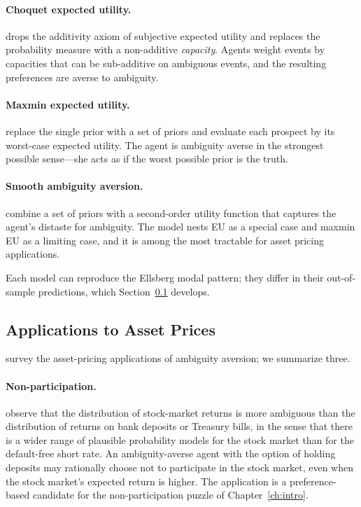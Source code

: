 \paragraph{Choquet expected utility.}
\citet{schmeidler1989} drops the additivity axiom of subjective expected utility and replaces the probability measure with a non-additive \emph{capacity}. Agents weight events by capacities that can be sub-additive on ambiguous events, and the resulting preferences are averse to ambiguity.

\paragraph{Maxmin expected utility.}
\citet{gilboaschmeidler1989} replace the single prior with a set of priors and evaluate each prospect by its worst-case expected utility. The agent is ambiguity averse in the strongest possible sense---she acts as if the worst possible prior is the truth.

\paragraph{Smooth ambiguity aversion.}
\citet{klibanoff2005} combine a set of priors with a second-order utility function that captures the agent's distaste for ambiguity. The model nests EU as a special case and maxmin EU as a limiting case, and it is among the most tractable for asset pricing applications.

Each model can reproduce the Ellsberg modal pattern; they differ in their out-of-sample predictions, which Section~\ref{sec:ambapplications} develops.

\subsection{Applications to Asset Prices}
\label{sec:ambapplications}

\citet{epstein2010} survey the asset-pricing applications of ambiguity aversion; we summarize three.

\paragraph{Non-participation.}
\citet{dow1992} observe that the distribution of stock-market returns is more ambiguous than the distribution of returns on bank deposits or Treasury bills, in the sense that there is a wider range of plausible probability models for the stock market than for the default-free short rate. An ambiguity-averse agent with the option of holding deposits may rationally choose not to participate in the stock market, even when the stock market's expected return is higher. The application is a preference-based candidate for the non-participation puzzle of Chapter~\ref{ch:intro}.

